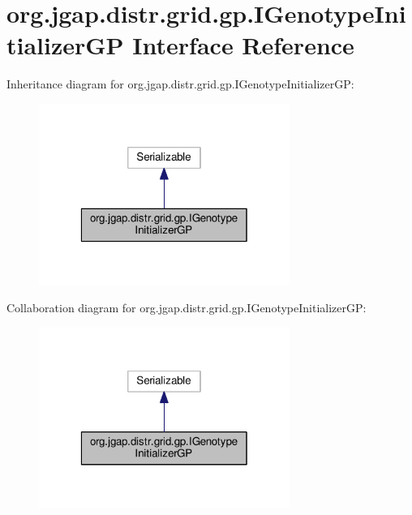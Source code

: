 \hypertarget{interfaceorg_1_1jgap_1_1distr_1_1grid_1_1gp_1_1_i_genotype_initializer_g_p}{\section{org.\-jgap.\-distr.\-grid.\-gp.\-I\-Genotype\-Initializer\-G\-P Interface Reference}
\label{interfaceorg_1_1jgap_1_1distr_1_1grid_1_1gp_1_1_i_genotype_initializer_g_p}
}


Inheritance diagram for org.\-jgap.\-distr.\-grid.\-gp.\-I\-Genotype\-Initializer\-G\-P\-:
\nopagebreak
\begin{figure}[H]
\begin{center}
\leavevmode
\includegraphics[width=232pt]{interfaceorg_1_1jgap_1_1distr_1_1grid_1_1gp_1_1_i_genotype_initializer_g_p__inherit__graph}
\end{center}
\end{figure}


Collaboration diagram for org.\-jgap.\-distr.\-grid.\-gp.\-I\-Genotype\-Initializer\-G\-P\-:
\nopagebreak
\begin{figure}[H]
\begin{center}
\leavevmode
\includegraphics[width=232pt]{interfaceorg_1_1jgap_1_1distr_1_1grid_1_1gp_1_1_i_genotype_initializer_g_p__coll__graph}
\end{center}
\end{figure}
